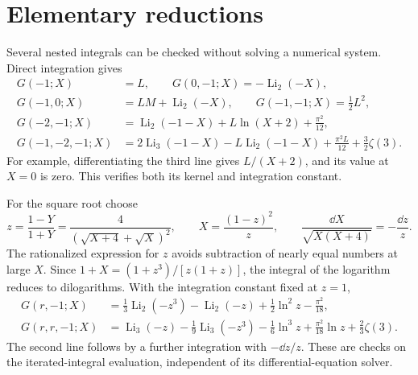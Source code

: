 \section{Elementary reductions}
\label{sec:comp-reference-elementary}
Several nested integrals can be checked without solving a numerical
system. Direct integration gives
\begin{align}
 G(-1;X)&=L,\qquad G(0,-1;X)=-\operatorname{Li}_2(-X),\\
 G(-1,0;X)&=LM+\operatorname{Li}_2(-X),\qquad
 G(-1,-1;X)=\tfrac12 L^2,\\
 G(-2,-1;X)&=\operatorname{Li}_2(-1-X)+L\ln(X+2)+\frac{\pi^2}{12},\\
 G(-1,-2,-1;X)&=2\operatorname{Li}_3(-1-X)
       -L\operatorname{Li}_2(-1-X)+\frac{\pi^2L}{12}
       +\frac32\zeta(3).
\end{align}
For example, differentiating the third line gives $L/(X+2)$,
and its value at $X=0$ is zero. This verifies both its kernel and
integration constant.

For the square root choose
\begin{equation}
 z=\frac{1-Y}{1+Y}
   =\frac4{(\sqrt{X+4}+\sqrt X)^2},\qquad
 X=\frac{(1-z)^2}{z},\qquad
 \frac{\dd X}{\sqrt{X(X+4)}}=-\frac{\dd z}{z}.
\end{equation}
The rationalized expression for $z$ avoids subtraction of nearly
equal numbers at large $X$. Since
$1+X=(1+z^3)/[z(1+z)]$, the integral of the logarithm reduces to
dilogarithms. With the integration constant fixed at $z=1$,
\begin{align}
 G(r,-1;X)&=\frac13\operatorname{Li}_2(-z^3)
       -\operatorname{Li}_2(-z)+\frac12\ln^2z-\frac{\pi^2}{18},\\
 G(r,r,-1;X)&=\operatorname{Li}_3(-z)
 -\frac19\operatorname{Li}_3(-z^3)-\frac16\ln^3z
 +\frac{\pi^2}{18}\ln z+\frac23\zeta(3).
\end{align}
The second line follows by a further integration with $-\dd z/z$.
These are checks on the iterated-integral evaluation, independent
of its differential-equation solver.

